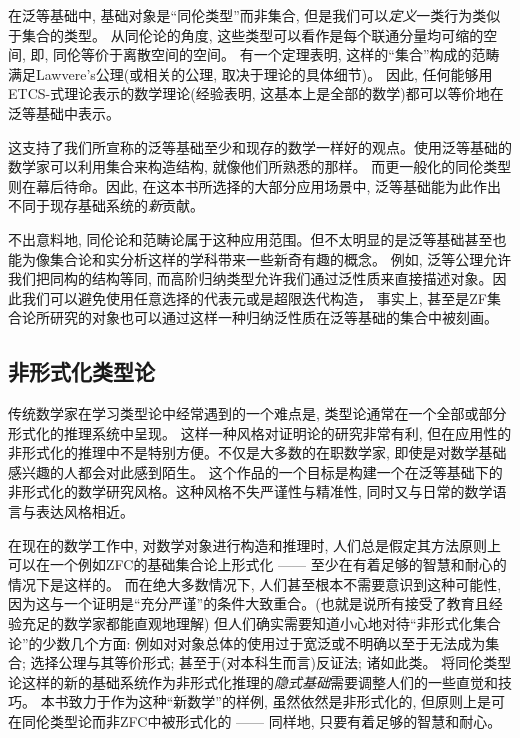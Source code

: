 在泛等基础中, 基础对象是``同伦类型''而非集合, 但是我们可以\emph{定义}一类行为类似于集合的类型。
从同伦论的角度, 这些类型可以看作是每个联通分量均可缩的空间, 即, 同伦等价于离散空间的空间。
%
有一个定理表明, 这样的``集合''构成的范畴满足Lawvere's公理(或相关的公理, 取决于理论的具体细节)。
因此, 任何能够用ETCS-式理论表示的数学理论(经验表明, 这基本上是全部的数学)都可以等价地在泛等基础中表示。

这支持了我们所宣称的泛等基础至少和现存的数学一样好的观点。使用泛等基础的数学家可以利用集合来构造结构, 就像他们所熟悉的那样。
而更一般化的同伦类型则在幕后待命。因此, 在这本书所选择的大部分应用场景中, 泛等基础能为此作出不同于现存基础系统的\emph{新}贡献。

不出意料地, 同伦论和范畴论属于这种应用范围。但不太明显的是泛等基础甚至也能为像集合论和实分析这样的学科带来一些新奇有趣的概念。
例如, 泛等公理允许我们把同构的结构等同, 而高阶归纳类型允许我们通过泛性质来直接描述对象。因此我们可以避免使用任意选择的代表元或是超限迭代构造，
事实上, 甚至是ZF集合论所研究的对象也可以通过这样一种归纳泛性质在泛等基础的集合中被刻画。

%


\subsection*{非形式化类型论}

%
%
%
%
传统数学家在学习类型论中经常遇到的一个难点是, 类型论通常在一个全部或部分形式化的推理系统中呈现。
这样一种风格对证明论的研究非常有利, 但在应用性的非形式化的推理中不是特别方便。不仅是大多数的在职数学家, 即使是对数学基础感兴趣的人都会对此感到陌生。
这个作品的一个目标是构建一个在泛等基础下的非形式化的数学研究风格。这种风格不失严谨性与精准性, 同时又与日常的数学语言与表达风格相近。

在现在的数学工作中, 对数学对象进行构造和推理时, 人们总是假定其方法原则上可以在一个例如ZFC的基础集合论上形式化 —— 至少在有着足够的智慧和耐心的情况下是这样的。
而在绝大多数情况下, 人们甚至根本不需要意识到这种可能性, 因为这与一个证明是``充分严谨''的条件大致重合。(也就是说所有接受了教育且经验充足的数学家都能直观地理解)
但人们确实需要知道小心地对待``非形式化集合论''的少数几个方面: 例如对对象总体的使用过于宽泛或不明确以至于无法成为集合; 选择公理与其等价形式; 甚至于(对本科生而言)反证法; 诸如此类。
将同伦类型论这样的新的基础系统作为非形式化推理的\emph{隐式基础}需要调整人们的一些直觉和技巧。
本书致力于作为这种``新数学''的样例, 虽然依然是非形式化的, 但原则上是可在同伦类型论而非ZFC中被形式化的 —— 同样地, 只要有着足够的智慧和耐心。

